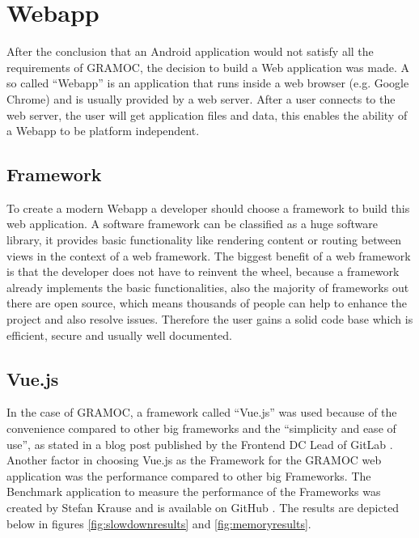 \chapter{Webapp}
\label{ch:Webapp}

\author{Nico Leidenfrost}
%
After the conclusion that an Android application would not satisfy all the requirements of GRAMOC, the decision to build a Web application was made. A so called ``Webapp'' is an application that runs inside a web browser (e.g. Google Chrome) and is usually provided by a web server. After a user connects to the web server, the user will get application files and data, this enables the ability of a Webapp to be platform independent.

\section{Framework}
To create a modern Webapp a developer should choose a framework to build this web application. A software framework can be classified as a huge software library, it provides basic functionality like rendering content or routing between views in the context of a web framework. The biggest benefit of a web framework is that the developer does not have to reinvent the wheel, because a framework already implements the basic functionalities, also the majority of frameworks out there are open source, which means thousands of people can help to enhance the project and also resolve issues. Therefore the user gains a solid code base which is efficient, secure and usually well documented.

\section{Vue.js}
In the case of GRAMOC, a framework called ``Vue.js'' was used because of the convenience compared to other big frameworks and the ``simplicity and ease of use'', as stated in a blog post published by the Frontend DC Lead of GitLab \autocite{Vue} \autocite{WhyVue} \autocite{GitLab}. Another factor in choosing Vue.js as the Framework for the GRAMOC web application was the performance compared to other big Frameworks. The Benchmark application to measure the performance of the Frameworks was created by Stefan Krause and is available on GitHub \autocite{FrameworkBenchmark}. The results are depicted below in figures \vref{fig:slowdownresults} and \vref{fig:memoryresults}.

\frameworkdata

